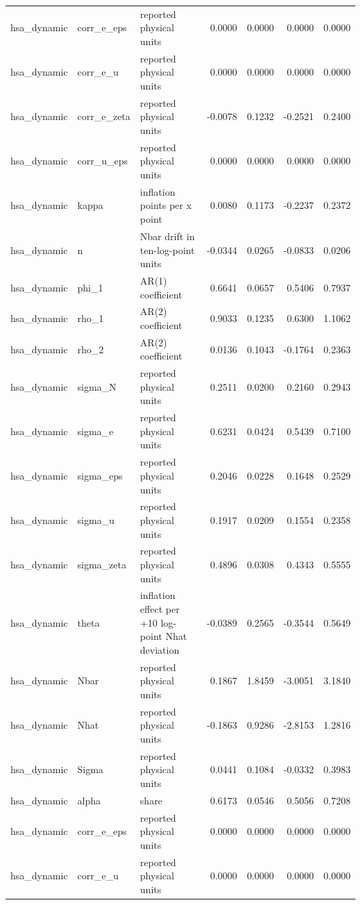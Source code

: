 \begin{tabular}{lllrrrr}
hsa\_dynamic & corr\_e\_eps & reported physical units & 0.0000 & 0.0000 & 0.0000 & 0.0000 \\
hsa\_dynamic & corr\_e\_u & reported physical units & 0.0000 & 0.0000 & 0.0000 & 0.0000 \\
hsa\_dynamic & corr\_e\_zeta & reported physical units & -0.0078 & 0.1232 & -0.2521 & 0.2400 \\
hsa\_dynamic & corr\_u\_eps & reported physical units & 0.0000 & 0.0000 & 0.0000 & 0.0000 \\
hsa\_dynamic & kappa & inflation points per x point & 0.0080 & 0.1173 & -0.2237 & 0.2372 \\
hsa\_dynamic & n & Nbar drift in ten-log-point units & -0.0344 & 0.0265 & -0.0833 & 0.0206 \\
hsa\_dynamic & phi\_1 & AR(1) coefficient & 0.6641 & 0.0657 & 0.5406 & 0.7937 \\
hsa\_dynamic & rho\_1 & AR(2) coefficient & 0.9033 & 0.1235 & 0.6300 & 1.1062 \\
hsa\_dynamic & rho\_2 & AR(2) coefficient & 0.0136 & 0.1043 & -0.1764 & 0.2363 \\
hsa\_dynamic & sigma\_N & reported physical units & 0.2511 & 0.0200 & 0.2160 & 0.2943 \\
hsa\_dynamic & sigma\_e & reported physical units & 0.6231 & 0.0424 & 0.5439 & 0.7100 \\
hsa\_dynamic & sigma\_eps & reported physical units & 0.2046 & 0.0228 & 0.1648 & 0.2529 \\
hsa\_dynamic & sigma\_u & reported physical units & 0.1917 & 0.0209 & 0.1554 & 0.2358 \\
hsa\_dynamic & sigma\_zeta & reported physical units & 0.4896 & 0.0308 & 0.4343 & 0.5555 \\
hsa\_dynamic & theta & inflation effect per +10 log-point Nhat deviation & -0.0389 & 0.2565 & -0.3544 & 0.5649 \\
hsa\_dynamic & Nbar & reported physical units & 0.1867 & 1.8459 & -3.0051 & 3.1840 \\
hsa\_dynamic & Nhat & reported physical units & -0.1863 & 0.9286 & -2.8153 & 1.2816 \\
hsa\_dynamic & Sigma & reported physical units & 0.0441 & 0.1084 & -0.0332 & 0.3983 \\
hsa\_dynamic & alpha & share & 0.6173 & 0.0546 & 0.5056 & 0.7208 \\
hsa\_dynamic & corr\_e\_eps & reported physical units & 0.0000 & 0.0000 & 0.0000 & 0.0000 \\
hsa\_dynamic & corr\_e\_u & reported physical units & 0.0000 & 0.0000 & 0.0000 & 0.0000 \\

\end{tabular}
